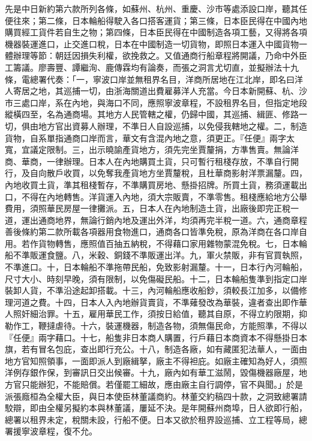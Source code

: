 \begin{pinyinscope}
先是中日新約第六款所列各條，如蘇州、杭州、重慶、沙市等處添設口岸，聽其任便往來；第二條，日本輪船得駛入各口搭客運貨；第三條，日本臣民得在中國內地購買經工貨件若自生之物；第四條，日本臣民得在中國制造各項工藝，又得將各項機器裝運進口，止交進口稅，日本在中國制造一切貨物，即照日本運入中國貨物一體辦理等節：朝廷因損失利權，欲挽救之。又值通商行船章程將開議，乃命中外臣工籌議。廖壽豐、譚繼洵、鹿傳霖均有論奏，而張之洞言尤切直，並擬辦法十九條，電總署代奏：「一，寧波口岸並無租界名目，洋商所居地在江北岸，即名曰洋人寄居之地，其巡捕一切，由浙海關道出費雇募洋人充當。今日本新開蘇、杭、沙市三處口岸，系在內地，與海口不同，應照寧波章程，不設租界名目，但指定地段縱橫四至，名為通商場。其地方人民管轄之權，仍歸中國，其巡捕、緝匪、修路一切，俱由地方官出資募人辦理，不準日人自設巡捕，以免侵我轄地之權。二，制造貨物，自系單指通商口岸而言，華文有含混內地之意，須更正。『任便』兩字太寬，宜議定限制。三，出示曉諭產貨地方，須先完坐賈釐捐，方準售賣。無論洋商、華商，一律辦理。日本人在內地購買土貨，只可暫行租棧存放，不準自行開行，及自向散戶收買，以免奪我產貨地方坐賈釐稅，且杜華商影射洋票漏釐。四，內地收買土貨，準其租棧暫存，不準購買房地、懸掛招牌。所買土貨，務須運載出口，不得在內地轉售。洋貨運入內地，須大宗販賣，不準零售。租棧應給地方公舉費用，須照華民房屋一律攤派。五，日本人在內地制造土貨，出廠後即完正稅一道，運出通商地界，無論行銷內地及運出外洋，均須再完半稅一道。六，通商章程善後條約第二款所載各項器用食物進口，通商各口皆準免稅，原為洋商在各口岸自用。若作貨物轉售，應照值百抽五納稅，不得藉口家用雜物蒙混免稅。七，日本輪船不準販運食鹽。八，米穀、銅錢不準販運出洋。九，軍火禁販，非有官買執照，不準進口。十，日本輪船不準拖帶民船，免致影射漏釐。十一，日本行內河輪船，尺寸大小、時刻早晚，須有限制，以免傷礙民船。十二，日本輪船隻準到指定口岸裝卸人貨，不準沿途起卸搭載。十三，內河輪船應收船鈔，須較長江加多，以備修理河道之費。十四，日本人入內地辦貨賣貨，不準薙發改為華裝，違者查出即作華人照奸細治罪。十五，雇用華民工作，須按日給值，聽其自原，不得立約限期，抑勒作工，鞭撻虐待。十六，裝運機器，制造各物，須無傷民命，方能照準，不得以『任便』兩字藉口。十七，船隻非日本商人購置，行戶藉日本商資本不得懸掛日本旗，若有冒名包庇，查出即行充公。十八，制造各廠，如有藏匿犯法華人，一面由地方官知照領事，一面即派人到廠緝拏，廠主不得袒庇。如廠主確知為好人，須照洋例存銀作保，到審訊日交出候審。十九，廠內如有華工滋鬧，毀傷機器廠屋，地方官只能辦犯，不能賠償。若僅罷工細故，應由廠主自行調停，官不與聞。」於是派張廕桓為全權大臣，與日本使臣林董議商約。林董交約稿四十款，之洞致總署請駮辯，即由全權另擬約本與林董議，屢延不決。是年開蘇州商埠，日人欲即行船，總署以租界未定，稅關未設，行船不便。日本又欲於租界設巡捕、立工程等局，總署援寧波章程，復不允。


\end{pinyinscope}
